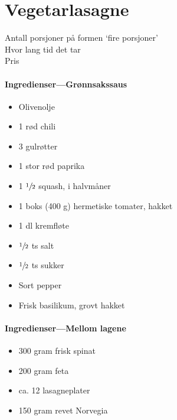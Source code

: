 \section{Vegetarlasagne}
\label{Vegetarlasagne}

Antall porsjoner på formen `fire porsjoner'\\
Hvor lang tid det tar\\
Pris

\paragraph{Ingredienser---Grønnsakssaus}
\begin{itemize}[noitemsep]
	\item Olivenolje
	\item 1 rød chili
	\item 3 gulrøtter
	\item 1 stor rød paprika
	\item 1 $\sfrac{1}{2}$ squash, i halvmåner
	\item 1 boks (400 g) hermetiske tomater, hakket
	\item 1 dl kremfløte
	\item $\sfrac{1}{2}$ ts salt
	\item $\sfrac{1}{2}$ ts sukker
	\item Sort pepper
	\item Frisk basilikum, grovt hakket
\end{itemize}

\paragraph{Ingredienser---Mellom lagene}
\begin{itemize}[noitemsep]
	\item 300 gram frisk spinat
	\item 200 gram feta
	\item ca. 12 lasagneplater
	\item 150 gram revet Norvegia
\end{itemize}


